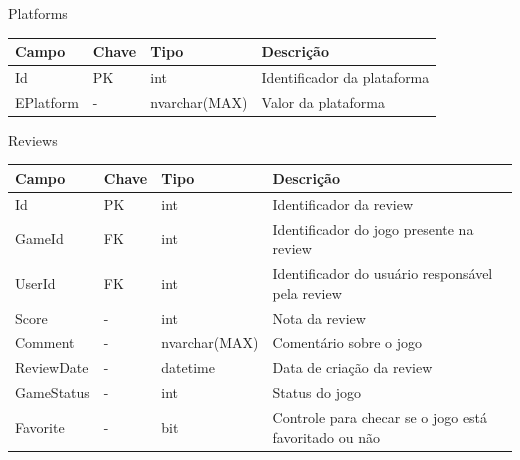 \begin{apendicesenv}
\begin{quadro}[h!]
\centering
\caption{Platforms}
\label{tab:platforms}
\begin{longtable}{|p{4cm}|p{2cm}|p{3cm}|p{5cm}|}
\hline
Campo & Chave & Tipo & Descrição
\\\hline
Id & PK & int & Identificador da plataforma
\\\hline
EPlatform & - & nvarchar(MAX) & Valor da plataforma
\\\hline
\end{longtable}
\end{quadro}

\begin{quadro}[h!]
\centering
\caption{Reviews}
\label{tab:reviews}
\begin{longtable}{|p{4cm}|p{2cm}|p{3cm}|p{5cm}|}
\hline
Campo & Chave & Tipo & Descrição
\\\hline
Id & PK & int & Identificador da review
\\\hline
GameId & FK & int & Identificador do jogo presente na review
\\\hline
UserId & FK & int & Identificador do usuário responsável pela review
\\\hline
Score & - & int & Nota da review
\\\hline
Comment & - & nvarchar(MAX) & Comentário sobre o jogo
\\\hline
ReviewDate & - & datetime & Data de criação da review
\\\hline
GameStatus & - & int & Status do jogo
\\\hline
Favorite & - & bit & Controle para checar se o jogo está favoritado ou não
\\\hline
\end{longtable}
\end{quadro}


\end{apendicesenv}
